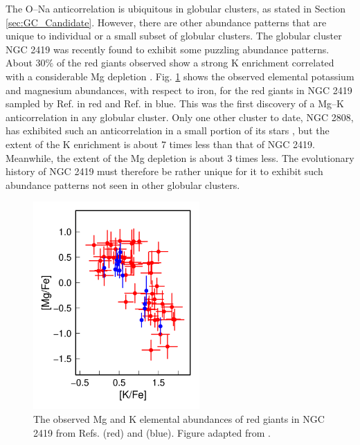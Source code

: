 The O--Na anticorrelation is ubiquitous in globular clusters, as stated in Section \ref{sec:GC_Candidate}. However, there are other abundance patterns that are unique to individual or a small subset of globular clusters. The globular cluster NGC 2419 was recently found to exhibit some puzzling abundance patterns. About 30$\%$ of the red giants observed show a strong K enrichment correlated with a considerable Mg depletion \cite{Mucciarelli2012,Cohen2012}. Fig. \ref{fig:MgK} shows the observed elemental potassium and magnesium abundances, with respect to iron, for the red giants in NGC 2419 sampled by Ref. \cite{Mucciarelli2012} in red and Ref. \cite{Cohen2012} in blue. This was the first discovery of a Mg--K anticorrelation in any globular cluster. Only one other cluster to date, NGC 2808, has exhibited such an anticorrelation in a small portion of its stars \cite{Mucciarelli2015,Mucciarelli2017}, but the extent of the K enrichment is about 7 times less than that of NGC 2419. Meanwhile, the extent of the Mg depletion is about 3 times less. The evolutionary history of NGC 2419 must therefore be rather unique for it to exhibit such abundance patterns not seen in other globular clusters.


\begin{figure}[t]
\centering
\includegraphics[width=2.5in]{Chapter-6/figs/MgK_Observation.png}
\caption{\label{fig:MgK}The observed Mg and K elemental abundances of red giants in NGC 2419 from Refs. \cite{Mucciarelli2012} (red) and \cite{Cohen2012} (blue). Figure adapted from \cite{Iliadis2016}.}
\end{figure}

